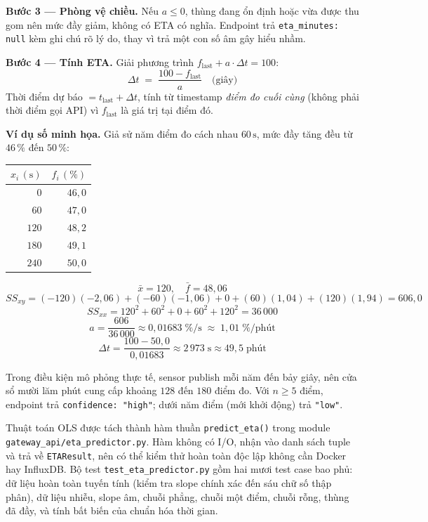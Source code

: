\documentclass[12pt,a4paper]{article}
\begin{document}
\textbf{Bước 3 — Phòng vệ chiều.} Nếu $a \leq 0$, thùng đang ổn định hoặc vừa được thu gom nên mức đầy giảm, không có ETA có nghĩa. Endpoint trả \texttt{eta\_minutes: null} kèm ghi chú rõ lý do, thay vì trả một con số âm gây hiểu nhầm.

\textbf{Bước 4 — Tính ETA.} Giải phương trình $f_{\text{last}} + a \cdot \Delta t = 100$:
\[
\Delta t \;=\; \frac{100 - f_{\text{last}}}{a} \quad \text{(giây)}
\]
Thời điểm dự báo $= t_{\text{last}} + \Delta t$, tính từ timestamp \emph{điểm đo cuối cùng} (không phải thời điểm gọi API) vì $f_{\text{last}}$ là giá trị tại điểm đó.

\textbf{Ví dụ số minh họa.} Giả sử năm điểm đo cách nhau $60\,\text{s}$, mức đầy tăng đều từ $46\,\%$ đến $50\,\%$:

\begin{center}
\begin{tabular}{rr}
\hline
$x_i\,(\text{s})$ & $f_i\,(\%)$ \\ \hline
$0$ & $46{,}0$ \\
$60$ & $47{,}0$ \\
$120$ & $48{,}2$ \\
$180$ & $49{,}1$ \\
$240$ & $50{,}0$ \\ \hline
\end{tabular}
\end{center}

\[
\bar{x} = 120, \quad \bar{f} = 48{,}06
\]
\[
SS_{xy} = (-120)(-2{,}06) + (-60)(-1{,}06) + 0 + (60)(1{,}04) + (120)(1{,}94) = 606{,}0
\]
\[
SS_{xx} = 120^2 + 60^2 + 0 + 60^2 + 120^2 = 36\,000
\]
\[
a = \frac{606}{36\,000} \approx 0{,}01683\;\%/\text{s} \;\approx\; 1{,}01\;\%/\text{phút}
\]
\[
\Delta t = \frac{100 - 50{,}0}{0{,}01683} \approx 2\,973\;\text{s} \approx 49{,}5\;\text{phút}
\]

Trong điều kiện mô phỏng thực tế, sensor publish mỗi năm đến bảy giây, nên cửa sổ mười lăm phút cung cấp khoảng $128$ đến $180$ điểm đo. Với $n \geq 5$ điểm, endpoint trả \texttt{confidence: "high"}; dưới năm điểm (mới khởi động) trả \texttt{"low"}.

Thuật toán OLS được tách thành hàm thuần \texttt{predict\_eta()} trong module \texttt{gateway\_api/eta\_predictor.py}. Hàm không có I/O, nhận vào danh sách tuple và trả về \texttt{ETAResult}, nên có thể kiểm thử hoàn toàn độc lập không cần Docker hay InfluxDB. Bộ test \texttt{test\_eta\_predictor.py} gồm hai mươi test case bao phủ: dữ liệu hoàn toàn tuyến tính (kiểm tra slope chính xác đến sáu chữ số thập phân), dữ liệu nhiễu, slope âm, chuỗi phẳng, chuỗi một điểm, chuỗi rỗng, thùng đã đầy, và tính bất biến của chuẩn hóa thời gian.
\end{document}
